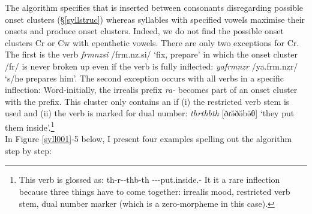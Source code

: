 The algorithm specifies that  is inserted between consonants disregarding possible onset clusters (\S{}\ref{syllstruc}) whereas syllables with specified vowels maximise their onsets and produce onset clusters. Indeed, we do not find the possible onset clusters Cr or Cw with epenthetic vowels. There are only two exceptions for Cr. The first is the verb \emph{frmnzsi} /frm.nz.si/ `fix, prepare' in which the onset cluster /fr/ is never broken up even if the verb is fully inflected: \emph{yafrmnzr} /ya.frm.nzr/ `s/he prepares him'. The second exception occurs with all verbs in a specific inflection: Word-initially, the irrealis prefix \emph{ra-} becomes part of an onset cluster with the  prefix. This cluster only contains an  if (i) the restricted verb stem is used and (ii) the verb is marked for dual number: \emph{thrthbth} [ðɾə̆ðə̆bə̆θ] `they put them inside'.\footnote{This verb is glossed as: th-r-\Zero{}-thb-th \Stnsg-\Irr-\Ndu-put.inside.\Rs{}-\Stnsg{} It it a rare inflection because three things have to come together: irrealis mood, restricted verb stem, dual number marker (which is a zero-morpheme in this case).}\\

In Figure \ref{syll001}-5 below, I present four examples spelling out the algorithm step by step:

